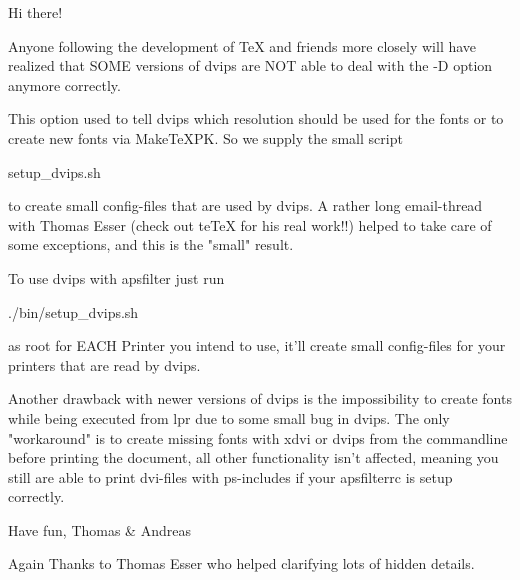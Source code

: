 
	Hi there!

	Anyone following the development of TeX and friends more
	closely will have realized that SOME versions of dvips are NOT
	able to deal with the -D option anymore correctly. 

	This option used to tell dvips which resolution should be used
	for the fonts or to create new fonts via MakeTeXPK. So we
	supply the small script 

		setup_dvips.sh

	to create small config-files that are used by dvips. A rather
	long email-thread with Thomas Esser (check out teTeX for his
	real work!!) helped to take care of some exceptions, and this
	is the "small" result.

	To use dvips with apsfilter just run 

		./bin/setup_dvips.sh

	as root for EACH Printer you intend to use, it'll create small
	config-files for your printers that are read by dvips.

	Another drawback with newer versions of dvips is the
	impossibility to create fonts while being executed from lpr
	due to some small bug in dvips. The only "workaround" is to
	create missing fonts with xdvi or dvips from the commandline
	before printing the document, all other functionality isn't
	affected, meaning you still are able to print dvi-files with
	ps-includes if your apsfilterrc is setup correctly.

	Have fun,
			Thomas & Andreas

	Again Thanks to Thomas Esser who helped clarifying lots of
	hidden details.

